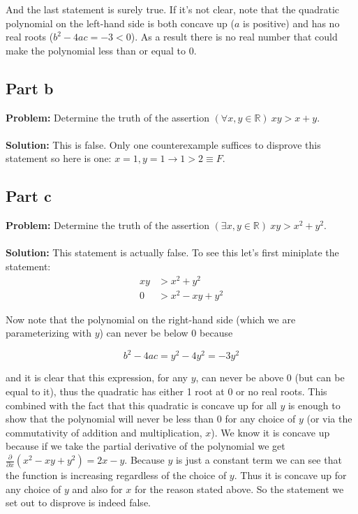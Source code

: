 \documentclass{article}
\begin{document}
And the last statement is surely true. If it's not clear, note that the quadratic polynomial on the left-hand side is both concave up ($a$ is positive) and has no real roots ($b^2-4ac=-3<0$). As a result there is no real number that could make the polynomial less than or equal to $0$.

\subsection{Part b}
\textbf{Problem:} Determine the truth of the assertion $(\forall x,y\in\mathbb R)\ xy>x+y$.
\\\\
\textbf{Solution:} This is false. Only one counterexample suffices to disprove this statement so here is one: $x=1,y=1\rightarrow 1>2\equiv F$.

\subsection{Part c}
\textbf{Problem:} Determine the truth of the assertion $(\exists x,y\in\mathbb R)\ xy>x^2+y^2$.
\\\\
\textbf{Solution:} This statement is actually false. To see this let's first miniplate the statement:
\begin{align*}
  xy&>x^2+y^2\\
  0&>x^2-xy+y^2
\end{align*}

Now note that the polynomial on the right-hand side (which we are parameterizing with $y$) can never be below 0 because

$$b^2-4ac=y^2-4y^2=-3y^2$$

and it is clear that this expression, for any $y$, can never be above 0 (but can be equal to it), thus the quadratic has either 1 root at 0 or no real roots. This combined with the fact that this quadratic is concave up for all $y$ is enough to show that the polynomial will never be less than 0 for any choice of $y$ (or via the commutativity of addition and multiplication, $x$). We know it is concave up because if we take the partial derivative of the polynomial we get $\frac{\partial}{\partial x}(x^2-xy+y^2)=2x-y$. Because $y$ is just a constant term we can see that the function is increasing regardless of the choice of $y$. Thus it is concave up for any choice of $y$ and also for $x$ for the reason stated above. So the statement we set out to disprove is indeed false.
\end{document}
